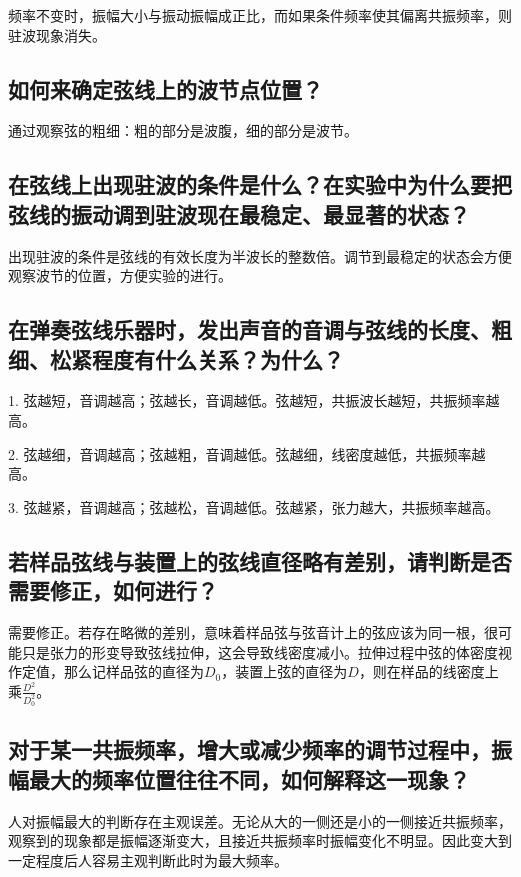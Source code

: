 \documentclass[11pt]{article}
\begin{document}
频率不变时，振幅大小与振动振幅成正比，而如果条件频率使其偏离共振频率，则驻波现象消失。

\subsection{如何来确定弦线上的波节点位置？}

通过观察弦的粗细：粗的部分是波腹，细的部分是波节。

\subsection{在弦线上出现驻波的条件是什么？在实验中为什么要把弦线的振动调到驻波现在最稳定、最显著的状态？}

出现驻波的条件是弦线的有效长度为半波长的整数倍。调节到最稳定的状态会方便观察波节的位置，方便实验的进行。

\subsection{在弹奏弦线乐器时，发出声音的音调与弦线的长度、粗细、松紧程度有什么关系？为什么？}

1. 弦越短，音调越高；弦越长，音调越低。弦越短，共振波长越短，共振频率越高。

2. 弦越细，音调越高；弦越粗，音调越低。弦越细，线密度越低，共振频率越高。

3. 弦越紧，音调越高；弦越松，音调越低。弦越紧，张力越大，共振频率越高。

\subsection{若样品弦线与装置上的弦线直径略有差别，请判断是否需要修正，如何进行？}

需要修正。若存在略微的差别，意味着样品弦与弦音计上的弦应该为同一根，很可能只是张力的形变导致弦线拉伸，这会导致线密度减小。拉伸过程中弦的体密度视作定值，那么记样品弦的直径为$D_0$，装置上弦的直径为$D$，则在样品的线密度上乘$\frac{D^2}{D_0^2}$。

\subsection{对于某一共振频率，增大或减少频率的调节过程中，振幅最大的频率位置往往不同，如何解释这一现象？}

人对振幅最大的判断存在主观误差。无论从大的一侧还是小的一侧接近共振频率，观察到的现象都是振幅逐渐变大，且接近共振频率时振幅变化不明显。因此变大到一定程度后人容易主观判断此时为最大频率。
\end{document}
